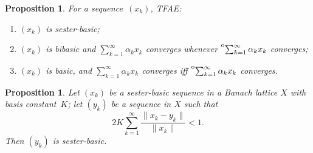 \documentclass[12pt]{amsart}
\theoremstyle{plain}
\newtheorem{proposition}[theorem]{Proposition}
\theoremstyle{definition}
\newcommand{\norm}[1]{\lVert#1\rVert}
\newcommand{\goeso}{\xrightarrow{\mathrm{o}}}	%
\newcommand{\s}{\sum_{k=1}^\infty}
\newcommand{\tos}{\prescript{{\rm o}}{}{\sum_{k=1}^\infty\,}}
\begin{document}
\begin{proposition}\label{ses}
  For a sequence~$(x_k)$, TFAE:
  \begin{enumerate}
  \item\label{ses-ses} $(x_k)$ is sester-basic;
  \item\label{ses-bib} $(x_k)$ is bibasic and $\s\alpha_kx_k$ converges
    whenever $\tos\alpha_kx_k$ converges;
  \item\label{ses-iff} $(x_k)$ is basic, and $\s\alpha_kx_k$ converges
    iff $\tos\alpha_kx_k$ converges.
  \end{enumerate}
\end{proposition}



  


\begin{proposition}\label{strong pert}
  Let $(x_k)$ be a sester-basic sequence in a Banach lattice $X$ with
  basis constant~$K$; let $(y_k)$ be a sequence in $X$ such that
  \begin{displaymath}
    2K\sum_{k=1}^\infty \frac{\norm{x_k-y_k}}{\norm{x_k}}<1.
  \end{displaymath}
  Then $(y_k)$ is sester-basic.
\end{proposition}
\end{document}
